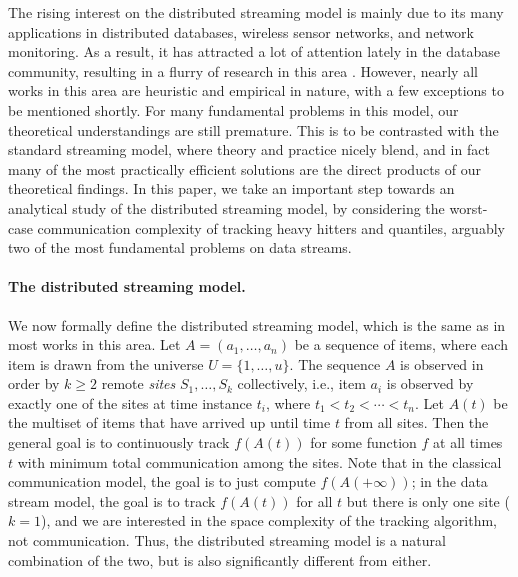 \documentclass[10pt]{article}
\begin{document}
The rising interest on the distributed streaming model is mainly due to its
many applications in distributed databases, wireless sensor networks, and
network monitoring.  As a result, it has attracted a lot of attention
lately in the database community, resulting in a flurry of research in this
area
\cite{Cormode:Muthukrishnan:Zhuang:07,cormode06:what,keralapura06,Cormode:Garofalakis:Muthukrishnan:Rastogi:05,cormode05:sketch,Olston:Jiang:Widom:03,Babcock:Olston:03,fuller07:_fids,deshpande04:_model,manjhi05:_findin,olston05:_effic,sharfman08:_shape}.
However, nearly all works in this area are heuristic and empirical
in nature, with a few exceptions to be mentioned shortly.  For many
fundamental problems in this model, our theoretical understandings are
still premature.  This is to be contrasted with the standard streaming
model, where theory and practice nicely blend, and in fact many of the most
practically efficient solutions are the direct products of our theoretical
findings.  In this paper, we take an important step towards an analytical
study of the distributed streaming model, by considering the worst-case
communication complexity of tracking heavy hitters and quantiles, arguably
two of the most fundamental problems on data streams.

\paragraph{The distributed streaming model.}
We now formally define the distributed streaming model, which is the same
as in most works in this area.  Let $A=(a_1, \dots, a_n)$ be a sequence of
items, where each item is drawn from the universe $U=\{1,\dots,u\}$.  The
sequence $A$ is observed in order by $k\ge 2$ remote {\em sites} $S_1,
\dots, S_k$ collectively, i.e., item $a_i$ is observed by exactly one of
the sites at time instance $t_i$, where $t_1 < t_2 < \cdots < t_n$.  Let
$A(t)$ be the multiset of items that have arrived up until time $t$ from
all sites.  Then the general goal is to continuously track $f(A(t))$ for
some function $f$ at all times $t$ with minimum total communication among
the sites.  Note that in the classical communication model, the goal is to
just compute $f(A(+\infty))$; in the data stream model, the goal is to
track $f(A(t))$ for all $t$ but there is only one site ($k=1$), and we are
interested in the space complexity of the tracking algorithm, not
communication.  Thus, the distributed streaming model is a natural
combination of the two, but is also significantly different from either.
\end{document}
